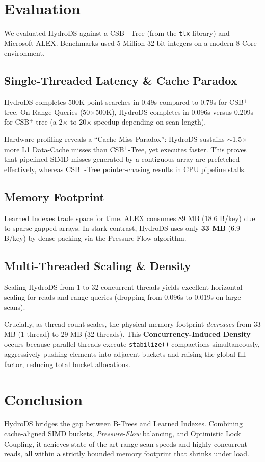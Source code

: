 \documentclass[sigconf]{acmart}
\begin{document}
\section{Evaluation}
We evaluated HydroDS against a CSB$^+$-Tree (from the \texttt{tlx} library) and Microsoft ALEX. Benchmarks used 5 Million 32-bit integers on a modern 8-Core environment.

\subsection{Single-Threaded Latency \& Cache Paradox}
HydroDS completes 500K point searches in 0.49s compared to 0.79s for CSB$^+$-tree. On Range Queries (50$\times$500K), HydroDS completes in 0.096s versus 0.209s for CSB$^+$-tree (a 2$\times$ to 20$\times$ speedup depending on scan length).

Hardware profiling reveals a ``Cache-Miss Paradox'': HydroDS sustains $\sim$1.5$\times$ more L1 Data-Cache misses than CSB$^+$-Tree, yet executes faster. This proves that pipelined SIMD misses generated by a contiguous array are prefetched effectively, whereas CSB$^+$-Tree pointer-chasing results in CPU pipeline stalls.

\subsection{Memory Footprint}
Learned Indexes trade space for time. ALEX consumes 89 MB (18.6 B/key) due to sparse gapped arrays. In stark contrast, HydroDS uses only \textbf{33 MB} (6.9 B/key) by dense packing via the Pressure-Flow algorithm.

\subsection{Multi-Threaded Scaling \& Density}
Scaling HydroDS from 1 to 32 concurrent threads yields excellent horizontal scaling for reads and range queries (dropping from 0.096s to 0.019s on large scans). 

Crucially, as thread-count scales, the physical memory footprint \textit{decreases} from 33 MB (1 thread) to 29 MB (32 threads). This \textbf{Concurrency-Induced Density} occurs because parallel threads execute \texttt{stabilize()} compactions simultaneously, aggressively pushing elements into adjacent buckets and raising the global fill-factor, reducing total bucket allocations.

\section{Conclusion}
HydroDS bridges the gap between B-Trees and Learned Indexes. Combining cache-aligned SIMD buckets, \textit{Pressure-Flow} balancing, and Optimistic Lock Coupling, it achieves state-of-the-art range scan speeds and highly concurrent reads, all within a strictly bounded memory footprint that shrinks under load.



\end{document}
